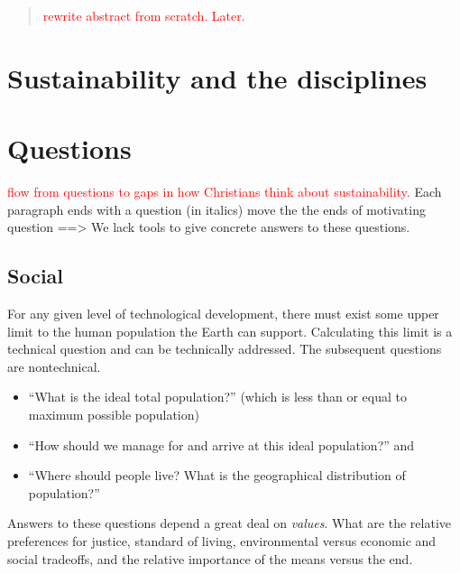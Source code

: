 \documentclass[12pt]{article}
\date{}                           %
\newcommand{\ins}[1]{\textcolor{red}{#1}}
\begin{document}
	
\maketitle

\begin{abstract}
\noindent
\ins{rewrite abstract from scratch. Later.}

\end{abstract}


\section{Sustainability and the disciplines}
\label{sec:sustainability_and_the_disciplines}



\section{Questions}
\label{sec:questions}

\ins{flow from questions to gaps in how Christians think about sustainability.}
Each paragraph ends with a question (in italics) 
move the the ends of motivating question ==> We lack tools to give concrete answers to these questions.

\subsection{Social}
For any given level of technological development, there must exist some upper limit to the human population the Earth
can support. Calculating this limit is a technical question and can be technically addressed. The subsequent questions are nontechnical.
\begin{itemize}
\item ``What is the ideal total population?'' (which is less than or equal to maximum possible population) %
\item ``How should we manage for and arrive at this ideal population?'' and %
\item ``Where should people live? What is the geographical distribution of population?'' %
\end{itemize}
Answers to these questions depend a great deal on \emph{values}. What are the relative preferences for justice, standard of living, 
environmental versus economic and social tradeoffs, and the relative importance of the means versus the end.
\end{document}
